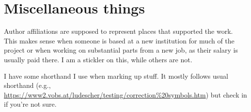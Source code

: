 \documentclass[11pt,letter]{article}
\begin{document}
\section{Miscellaneous things}

Author affiliations are supposed to represent places that supported the work. This makes sense when someone is based at a new institution for much of the project or when working on substantial parts from a new job, as their salary is usually paid there. I am a stickler on this, while others are not.

I have some shorthand I use when marking up stuff. It mostly follows usual shorthand (e.g., \url{https://www2.vobs.at/ludescher/testing/correction%20symbols.htm}) but check in if you're not sure. 
\end{document}
